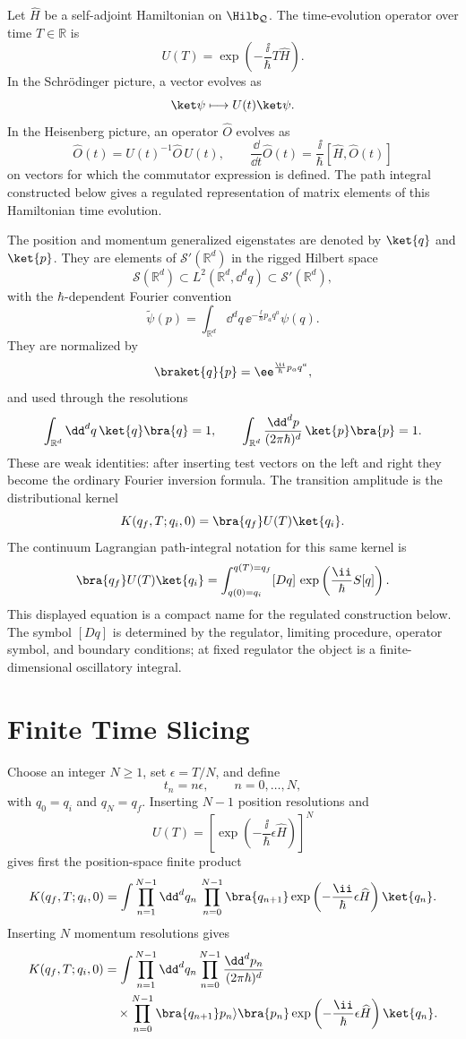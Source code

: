 Let \(\widehat H\) be a self-adjoint Hamiltonian on \(\Hilb_{\mathcal Q}\).
The time-evolution operator over time \(T\in\mathbb R\) is
\[
  U(T)=\exp\left(-\frac{\ii}{\hbar}T\widehat H\right).
\]
In the Schr\"odinger picture, a vector evolves as
\[
  \ket\psi\longmapsto U(t)\ket\psi .
\]
In the Heisenberg picture, an operator \(\widehat O\) evolves as
\[
  \widehat O(t)=U(t)^{-1}\widehat O\,U(t),
  \qquad
  \frac{\dd}{\dd t}\widehat O(t)
  =
  \frac{\ii}{\hbar}[\widehat H,\widehat O(t)]
\]
on vectors for which the commutator expression is defined.  The path integral
constructed below gives a regulated representation of matrix elements of this
Hamiltonian time evolution.

The position and momentum generalized eigenstates are denoted by
\(\ket{q}\) and \(\ket{p}\). They are elements of
\(\mathcal S'(\mathbb R^d)\) in the rigged Hilbert space
\[
  \mathcal S(\mathbb R^d)
  \subset
  L^2(\mathbb R^d,\dd^dq)
  \subset
  \mathcal S'(\mathbb R^d),
\]
with the \(\hbar\)-dependent Fourier convention
\[
  \widetilde\psi(p)
  =
  \int_{\mathbb R^d}\dd^dq\,
  \ee^{-\frac{\ii}{\hbar}p_aq^a}\psi(q).
\]
They are normalized by
\[
  \braket{q}{p}=\ee^{\frac{\ii}{\hbar}p_aq^a},
\]
and used through the resolutions
\[
  \int_{\mathbb R^d}\dd^dq\,\ket{q}\bra{q}=1,
  \qquad
  \int_{\mathbb R^d}\frac{\dd^dp}{(2\pi\hbar)^d}\,\ket{p}\bra{p}=1.
\]
These are weak identities: after inserting test vectors on the left and right
they become the ordinary Fourier inversion formula.
The transition amplitude is the distributional kernel
\[
  K(q_f,T;q_i,0)
  =
  \bra{q_f}U(T)\ket{q_i}.
\]
The continuum Lagrangian path-integral notation for this same kernel is
\[
  \bra{q_f}U(T)\ket{q_i}
  =
  \int_{q(0)=q_i}^{q(T)=q_f} [Dq]\,
  \exp\left(\frac{\ii}{\hbar}S[q]\right).
\]
This displayed equation is a compact name for the regulated construction
below.  The symbol \([Dq]\) is determined by the regulator, limiting procedure,
operator symbol, and boundary conditions; at fixed regulator the object is a
finite-dimensional oscillatory integral.

\section{Finite Time Slicing}

Choose an integer \(N\ge1\), set \(\epsilon=T/N\), and define
\[
  t_n=n\epsilon,\qquad n=0,\ldots,N,
\]
with \(q_0=q_i\) and \(q_N=q_f\). Inserting \(N-1\) position resolutions and
\[
  U(T)=\left[\exp\left(-\frac{\ii}{\hbar}\epsilon\widehat H\right)\right]^N
\]
gives first the position-space finite product
\[
  K(q_f,T;q_i,0)
  =
  \int\prod_{n=1}^{N-1}\dd^dq_n\,
  \prod_{n=0}^{N-1}
  \bra{q_{n+1}}
  \exp\left(-\frac{\ii}{\hbar}\epsilon\widehat H\right)
  \ket{q_n}.
\]
Inserting \(N\) momentum resolutions gives
\[
\begin{aligned}
  K(q_f,T;q_i,0)
  &=
  \int\prod_{n=1}^{N-1}\dd^dq_n
  \prod_{n=0}^{N-1}
  \frac{\dd^dp_n}{(2\pi\hbar)^d}
  \\
  &\quad\times
  \prod_{n=0}^{N-1}
  \bra{q_{n+1}}p_n\rangle
  \bra{p_n}\exp\left(-\frac{\ii}{\hbar}\epsilon\widehat H\right)\ket{q_n}.
\end{aligned}
\]

